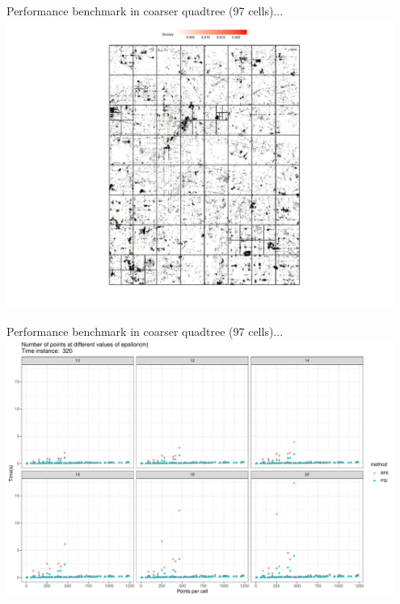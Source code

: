\documentclass{beamer}
\begin{document}
\begin{frame}{Performance benchmark in coarser quadtree (97 cells)...}
    \centering
    \includegraphics[width=0.95\textwidth]{figures/coarser/density}
\end{frame}


\begin{frame}{Performance benchmark in coarser quadtree (97 cells)...}
    \centering
    \includegraphics[width=0.95\textwidth]{figures/coarser/psi_count_320}
\end{frame}
\end{document}
